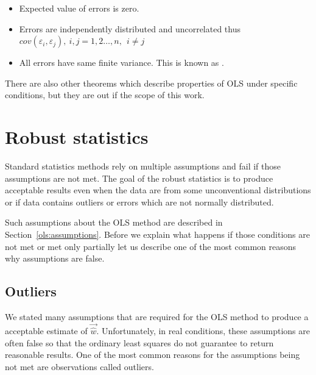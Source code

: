 \begin{itemize} \label{ols:assumptions}
  \item Expected value of errors is zero.
  \item Errors are independently distributed and uncorrelated thus \\ $cov(\varepsilon_i, \varepsilon_j), \ i, j = 1, 2 \ldots , n, \ \ i \neq j$
 \item All errors have same finite variance. This is known as .
\end{itemize}


There are also other theorems which describe properties of OLS under specific conditions, but they are out if the scope of this work.



\section{Robust statistics} \label{section:roboust}
Standard statistics methods rely on multiple assumptions and fail if those assumptions are not met. The goal of the robust statistics is to produce acceptable results even when the data are from some unconventional distributions or if data contains outliers or errors which are not normally distributed. 

Such assumptions about the OLS method are described in Section~\ref{ols:assumptions}. Before we explain what happens if those conditions are not met or met only partially let us describe one of the most common reasons why assumptions are false.

\subsection{Outliers}
We stated many assumptions that are required for the OLS method to produce a acceptable estimate of $\vec{\hat{w}}$. Unfortunately, in real conditions, these assumptions are often false so that the ordinary least squares do not guarantee to return reasonable results. One of the most common reasons for the assumptions being not met are observations called outliers.

